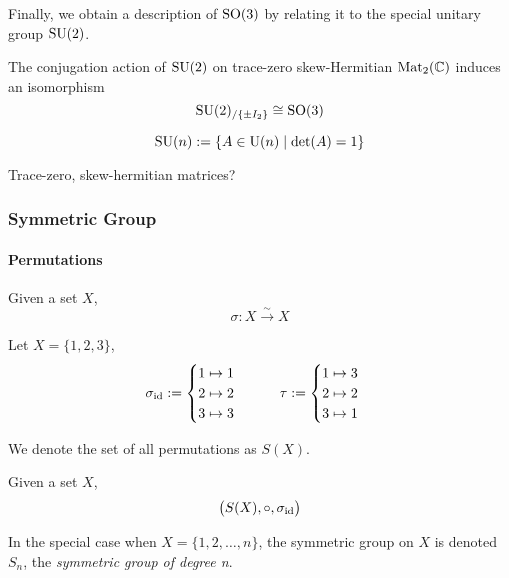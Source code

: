 Finally, we obtain a description of \(\operatorname{SO}(3)\) by relating it to the special unitary group \(\operatorname{SU}(2)\).

\begin{proposition}
   The conjugation action of \(\operatorname{SU}(2)\) on trace-zero skew-Hermitian \(\operatorname{Mat}_2(\mathbb{C})\) induces an isomorphism
   \[\operatorname{SU}(2)_{/\{\pm I_2\}} \cong \operatorname{SO}(3)\]
\end{proposition}

\begin{proposition}
   \[\operatorname{SU}(n) := \{A \in \operatorname{U}(n) \mid \det(A) = 1\}\]
\end{proposition}
\begin{remark}
   Trace-zero, skew-hermitian matrices?
\end{remark}

\subsubsection{Symmetric Group}
\paragraph{Permutations}
\begin{definition}[Permutation]\label{def:permutation}
   Given a set \(X\),
   \[\sigma: X \xrightarrow{\sim} X\]
\end{definition}
\begin{example}
   Let \(X = \{1, 2, 3\}\),
   \[\sigma_{\operatorname{id}} := \begin{cases}1 \mapsto 1\\ 2 \mapsto 2 \\ 3 \mapsto 3 \end{cases} \qquad \tau := \begin{cases}1 \mapsto 3\\ 2 \mapsto 2 \\ 3 \mapsto 1 \end{cases}\]
\end{example}
\begin{remark}[Notation]
   We denote the set of all permutations as \(S(X)\).
\end{remark}

\begin{definition}
   Given a set \(X\),
   \[\big(S(X), \circ, \sigma_{\operatorname{id}}\big)\]
\end{definition}

In the special case when \(X = \{1, 2, \ldots, n\}\), the symmetric group on \(X\) is denoted \(S_n\), the \emph{symmetric group of degree n}.

